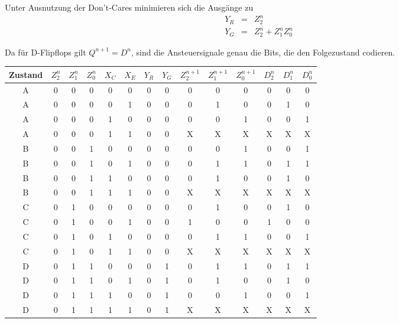 \documentclass{CInf_practice}
\begin{document}
Unter Ausnutzung der Don't-Cares minimieren sich die Ausgänge zu
\begin{eqnarray*}
   Y_R & = & Z_2^n \\
   Y_G & = & Z_2^n + Z_1^nZ_0^n
\end{eqnarray*}

Da für D-Flipflops gilt $Q^{n+1} = D^n$, sind die Ansteuersignale genau die
Bits, die den Folgezustand codieren.

\begin{center}
   \addtolength{\tabcolsep}{-3pt}
   \begin{tabular}{cccc|cc|cc|ccc>{\columncolor{lightgray!50}}c>{\columncolor{lightgray!50}}c>{\columncolor{lightgray!50}}c}
      \hline
      Zustand & $Z_2^n$ & $Z_1^n$ & $Z_0^n$ & $X_C$ & $X_E$ & $Y_R$ & $Y_G$ &
      $Z_2^{n+1}$ & $Z_1^{n+1}$ & $Z_0^{n+1}$ & $D_2^n$ & $D_1^n$ & $D_0^n$ \\
      \hline\hline
      A & 0 & 0 & 0 & 0 & 0 & 0 & 0 & 0 & 0 & 0 & 0 & 0 & 0 \\
      A & 0 & 0 & 0 & 0 & 1 & 0 & 0 & 0 & 1 & 0 & 0 & 1 & 0 \\
      A & 0 & 0 & 0 & 1 & 0 & 0 & 0 & 0 & 0 & 1 & 0 & 0 & 1 \\
      A & 0 & 0 & 0 & 1 & 1 & 0 & 0 & X & X & X & X & X & X \\\hline

      B & 0 & 0 & 1 & 0 & 0 & 0 & 0 & 0 & 0 & 1 & 0 & 0 & 1 \\
      B & 0 & 0 & 1 & 0 & 1 & 0 & 0 & 0 & 1 & 1 & 0 & 1 & 1 \\
      B & 0 & 0 & 1 & 1 & 0 & 0 & 0 & 0 & 1 & 0 & 0 & 1 & 0 \\
      B & 0 & 0 & 1 & 1 & 1 & 0 & 0 & X & X & X & X & X & X \\\hline

      C & 0 & 1 & 0 & 0 & 0 & 0 & 0 & 0 & 1 & 0 & 0 & 1 & 0 \\
      C & 0 & 1 & 0 & 0 & 1 & 0 & 0 & 1 & 0 & 0 & 1 & 0 & 0 \\
      C & 0 & 1 & 0 & 1 & 0 & 0 & 0 & 0 & 1 & 1 & 0 & 0 & 1 \\
      C & 0 & 1 & 0 & 1 & 1 & 0 & 0 & X & X & X & X & X & X \\\hline

      D & 0 & 1 & 1 & 0 & 0 & 0 & 1 & 0 & 1 & 1 & 0 & 1 & 1 \\
      D & 0 & 1 & 1 & 0 & 1 & 0 & 1 & 0 & 1 & 0 & 0 & 1 & 0 \\
      D & 0 & 1 & 1 & 1 & 0 & 0 & 1 & 0 & 0 & 1 & 0 & 0 & 1 \\
      D & 0 & 1 & 1 & 1 & 1 & 0 & 1 & X & X & X & X & X & X \\\hline


\end{tabular}
\end{center}
\end{document}
